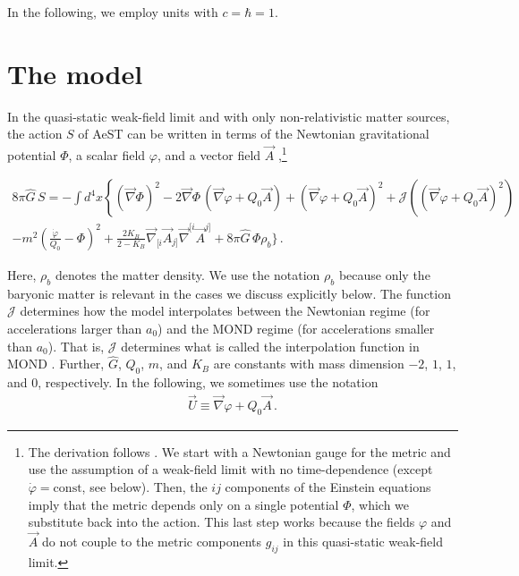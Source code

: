 \documentclass[reprint, amsmath,amssymb, nofootinbib, aps, prd]{revtex4-2}
\begin{document}
In the following, we employ units with $c = \hbar = 1$.

\section{The model}
\label{sec:model}

In the quasi-static weak-field limit and with only non-relativistic matter sources, the action $S$ of AeST can be written in terms of the Newtonian gravitational potential $\Phi$, a scalar field $\varphi$, and a vector field $\vec{A}$ \citep{Skordis2020,Mistele2023},\footnote{
  The derivation follows \cite{Skordis2020}.
  We start with a Newtonian gauge for the metric and use the assumption of a weak-field limit with no time-dependence (except $\dot{\varphi} = \mathrm{const}$, see below).
  Then, the $ij$ components of the Einstein equations imply that the metric depends only on a single potential $\Phi$, which we substitute back into the action.
  This last step works because the fields $\varphi$ and $\vec{A}$ do not couple to the metric components $g_{ij}$ in this quasi-static weak-field limit.
}
\begin{widetext}
\begin{multline}
 \label{eq:actionwithA}
 8 \pi \hat{G} \, S =
 - \int d^4x \left\{(\vec{\nabla} \Phi)^2 - 2 \vec{\nabla} \Phi \, (\vec{\nabla} \varphi + Q_0 \vec{A})  \right.
 + (\vec{\nabla} \varphi + Q_0 \vec{A})^2
 + \mathcal{J}\left((\vec{\nabla} \varphi + Q_0 \vec{A})^2\right)
 \\
- m^2 \left(\frac{\dot{\varphi}}{Q_0} - \Phi\right)^2
+ \frac{2K_B}{2-K_B} \vec{\nabla}_{[i} \vec{A}_{j]}  \vec{\nabla}^{[i} \vec{A}^{j]}
+ 8 \pi \hat{G} \, \Phi \rho_b
\bigg\}
\,.
\end{multline}
\end{widetext}
Here, $\rho_b$ denotes the matter density.
We use the notation $\rho_b$ because only the baryonic matter is relevant in the cases we discuss explicitly below.
The function $\mathcal{J}$ determines how the model interpolates between the Newtonian regime (for accelerations larger than $a_0$) and the MOND regime (for accelerations smaller than $a_0$).
That is, $\mathcal{J}$ determines what is called the interpolation function in MOND \citep{Famaey2012}.
Further, $\hat{G}$, $Q_0$, $m$, and $K_B$ are constants with mass dimension $-2$, $1$, $1$, and $0$, respectively.
In the following, we sometimes use the notation
\begin{align}
 \label{eq:Udef}
 \vec{U} \equiv \vec{\nabla} \varphi + Q_0 \vec{A} \,.
\end{align}
\end{document}
